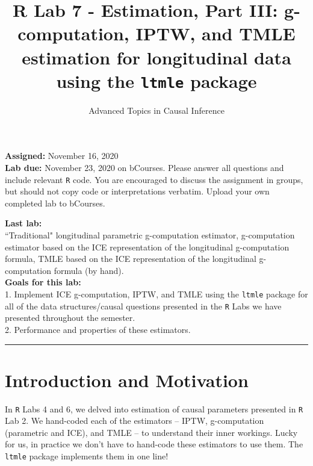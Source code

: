 \documentclass{exam}
\title{R Lab 7 - Estimation, Part III: g-computation, IPTW, and TMLE estimation for longitudinal data using the \texttt{ltmle} package}
\author{Advanced Topics in Causal Inference}
\date{}
\begin{document}
\maketitle



\maketitle
\noindent \textbf{Assigned:} November 16, 2020\\
\textbf{Lab due:} November 23, 2020 on bCourses. Please answer all questions and include relevant \texttt{R} code. You are encouraged to discuss the assignment in groups, but should not copy code or interpretations verbatim. Upload your own completed lab to bCourses.



\noindent \textbf{Last lab:} \\ 
``Traditional" longitudinal parametric g-computation estimator, g-computation estimator based on the ICE representation of the longitudinal g-computation formula, TMLE based on the ICE representation of the longitudinal g-computation formula (by hand). \\


\noindent \textbf{Goals for this lab:} \\
1. Implement ICE g-computation, IPTW, and TMLE using the \texttt{ltmle} package for all of the data structures/causal questions presented in the \texttt{R} Labs we have presented throughout the semester.\\
2. Performance and properties of these estimators. \\


\begin{center}
\noindent\rule{18cm}{0.4pt}
\end{center}

\section{Introduction and Motivation}


In \texttt{R} Labs 4 and 6, we delved into estimation of causal parameters presented in \texttt{R} Lab 2. We hand-coded each of the estimators -- IPTW, g-computation (parametric and ICE), and TMLE -- to understand their inner workings. Lucky for us, in practice we don't have to hand-code these estimators to use them. The \texttt{ltmle} package implements them in one line! \\
\end{document}
